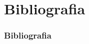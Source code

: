 {    %
}







\section{Bibliografia}
\begin{frame}[allowframebreaks]
    \frametitle{Bibliografia}
    
\end{frame}